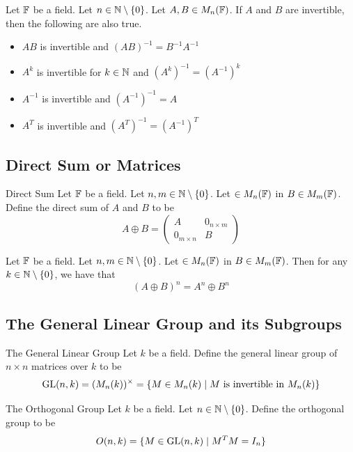 \documentclass[a4paper]{article}
\begin{document}
\begin{prp}{}{} Let $\mathbb{F}$ be a field. Let $n\in\mathbb{N}\setminus\{0\}$. Let $A,B\in M_n(\mathbb{F})$. If $A$ and $B$ are invertible, then the following are also true. 
\begin{itemize}
\item $AB$ is invertible and $(AB)^{-1}=B^{-1}A^{-1}$
\item $A^k$ is invertible for $k\in\mathbb{N}$ and $(A^k)^{-1}=(A^{-1})^k$
\item $A^{-1}$ is invertible and $(A^{-1})^{-1}=A$
\item $A^T$ is invertible and $(A^T)^{-1}=(A^{-1})^T$
\end{itemize}
\end{prp}

\subsection{Direct Sum or Matrices}
\begin{defn}{Direct Sum}{} Let $\mathbb{F}$ be a field. Let $n,m\in\mathbb{N}\setminus\{0\}$. Let $\in M_n(\mathbb{F})$ in $B\in M_m(\mathbb{F})$. Define the direct sum of $A$ and $B$ to be $$A\oplus B=\begin{pmatrix}
A & 0_{n\times m}\\
0_{m\times n} & B
\end{pmatrix}$$
\end{defn}

\begin{lmm}{}{} Let $\mathbb{F}$ be a field. Let $n,m\in\mathbb{N}\setminus\{0\}$. Let $\in M_n(\mathbb{F})$ in $B\in M_m(\mathbb{F})$. Then for any $k\in\mathbb{N}\setminus\{0\}$, we have that $$(A\oplus B)^n=A^n\oplus B^n$$
\end{lmm}

\subsection{The General Linear Group and its Subgroups}
\begin{defn}{The General Linear Group}{} Let $k$ be a field. Define the general linear group of $n\times n$ matrices over $k$ to be $$\operatorname{GL}(n,k)=(M_n(k))^\times=\{M\in M_n(k)\;|\;M\text{ is invertible in }M_n(k)\}$$
\end{defn}

\begin{defn}{The Orthogonal Group}{} Let $k$ be a field. Let $n\in\mathbb{N}\setminus\{0\}$. Define the orthogonal group to be $$O(n,k)=\{M\in\operatorname{GL}(n,k)\;|\;M^TM=I_n\}$$
\end{defn}
\end{document}

